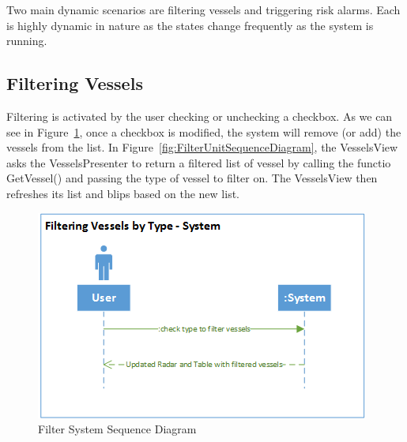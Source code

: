 \documentclass[12pt]{article}
\begin{document}
Two main dynamic scenarios are filtering vessels and triggering risk alarms. Each is highly dynamic in nature as the states change frequently as the system is running. 

\subsection{Filtering Vessels}

Filtering is activated by the user checking or unchecking a checkbox. As we can see in Figure~\ref{fig:FilterSystemSequenceDiagram}, once a checkbox is modified, the system will remove (or add) the vessels from the list. In Figure~\ref{fig:FilterUnitSequenceDiagram}, the VesselsView asks the VesselsPresenter to return a filtered list of vessel by calling the functio GetVessel() and passing the type of vessel to filter on. The VesselsView then refreshes its list and blips based on the new list.\\

\begin{figure}[h!]
    \centering
    \includegraphics[scale=0.9]{4_filter_system}
    \caption{Filter System Sequence Diagram}
    \label{fig:FilterSystemSequenceDiagram}
\end{figure}
\end{document}
